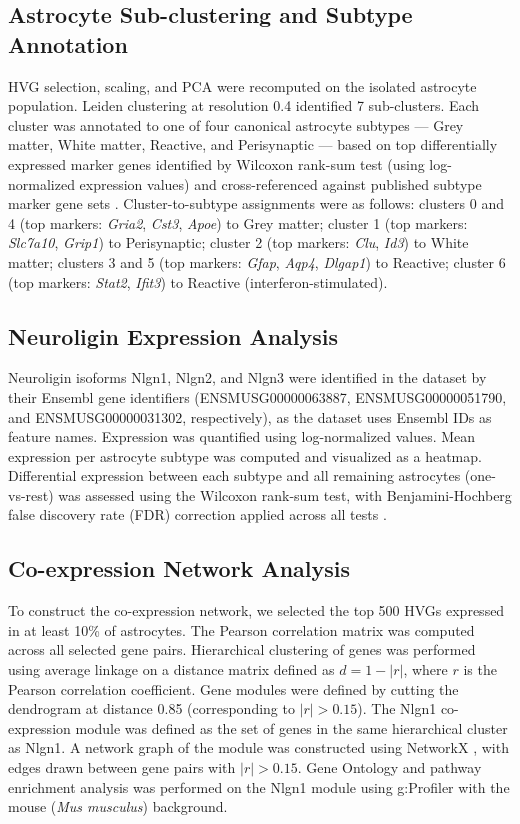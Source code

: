 \documentclass[sigconf]{acmart}
\begin{document}
\subsection{Astrocyte Sub-clustering and Subtype Annotation}
HVG selection, scaling, and PCA were recomputed on the isolated astrocyte population. Leiden clustering at resolution 0.4 identified 7 sub-clusters. Each cluster was annotated to one of four canonical astrocyte subtypes --- Grey matter, White matter, Reactive, and Perisynaptic --- based on top differentially expressed marker genes identified by Wilcoxon rank-sum test (using log-normalized expression values) and cross-referenced against published subtype marker gene sets \cite{bayraktar2020astrocyte, zeisel2018molecular}. Cluster-to-subtype assignments were as follows: clusters 0 and 4 (top markers: \textit{Gria2}, \textit{Cst3}, \textit{Apoe}) to Grey matter; cluster 1 (top markers: \textit{Slc7a10}, \textit{Grip1}) to Perisynaptic; cluster 2 (top markers: \textit{Clu}, \textit{Id3}) to White matter; clusters 3 and 5 (top markers: \textit{Gfap}, \textit{Aqp4}, \textit{Dlgap1}) to Reactive; cluster 6 (top markers: \textit{Stat2}, \textit{Ifit3}) to Reactive (interferon-stimulated).

\subsection{Neuroligin Expression Analysis}
Neuroligin isoforms Nlgn1, Nlgn2, and Nlgn3 were identified in the dataset by their Ensembl gene identifiers (ENSMUSG00000063887, ENSMUSG00000051790, and ENSMUSG00000031302, respectively), as the dataset uses Ensembl IDs as feature names. Expression was quantified using log-normalized values. Mean expression per astrocyte subtype was computed and visualized as a heatmap. Differential expression between each subtype and all remaining astrocytes (one-vs-rest) was assessed using the Wilcoxon rank-sum test, with Benjamini-Hochberg false discovery rate (FDR) correction applied across all tests \cite{benjamini1995controlling}.

\subsection{Co-expression Network Analysis}
To construct the co-expression network, we selected the top 500 HVGs expressed in at least 10\% of astrocytes. The Pearson correlation matrix was computed across all selected gene pairs. Hierarchical clustering of genes was performed using average linkage on a distance matrix defined as $d = 1 - |r|$, where $r$ is the Pearson correlation coefficient. Gene modules were defined by cutting the dendrogram at distance 0.85 (corresponding to $|r| > 0.15$). The Nlgn1 co-expression module was defined as the set of genes in the same hierarchical cluster as Nlgn1. A network graph of the module was constructed using NetworkX \cite{hagberg2008networkx}, with edges drawn between gene pairs with $|r| > 0.15$. Gene Ontology and pathway enrichment analysis was performed on the Nlgn1 module using g:Profiler \cite{raudvere2019gprofiler} with the mouse (\textit{Mus musculus}) background.
\end{document}
